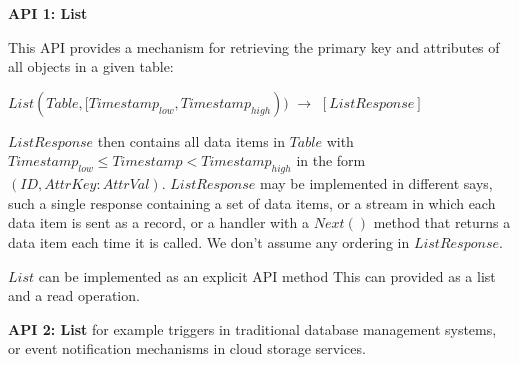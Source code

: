 \noindent
\textbf{API 1: List}

\noindent
This API provides a mechanism for retrieving the primary key and attributes of all objects in a given table:

$List(Table, [Timestamp_{low}, Timestamp_{high}))$ $\rightarrow$ $[ListResponse]$

\noindent
$ListResponse$ then contains all data items in $Table$ with $Timestamp_{low} \leq Timestamp < Timestamp_{high}$
in the form $(ID, {AttrKey: AttrVal})$.
$ListResponse$ may be implemented in different says, such a single response containing a set of
data items, or a stream in which each data item is sent as a record, or a handler with a $Next()$ method that returns a
data item each time it is called.
We don't assume any ordering in $ListResponse$.

$List$ can be implemented as an explicit API method This can provided as a list and a read operation.

\noindent
\textbf{API 2: List}
  for example triggers in traditional
  database management systems, or event notification mechanisms in cloud storage services.
















